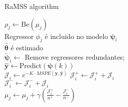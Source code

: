 \documentclass[12pt,a4paper,titlepage,final]{book}
\theoremstyle{definition}
\begin{document}
%

\begin{algorithm}[htpb]
  \caption{RaMSS algorithm}\label{alg:RaMSS}
  {
     {
        {
           $\rho_j \gets \text{Be}(\mu_j)$ \\
           {
              Regressor $\phi_j$ é incluido no modelo $\bm{\psi}_i$\\
           }
        }
        $\hat{\bm{\theta}}$ é estimado \\
        $\tilde{\bm{\psi}}_i \gets $ Remove regressores redundantes; \\
        $\hat{\bm{y}} \gets \text{Predict}(\bm{\psi}(k))$ \\
        $\mathcal{J}_i \gets e^{-K\cdot MSPE(\bm{y},\bm{\hat{y}})} $
     }
     {
        {
           {
              $\mathcal{J}_i^{+} \gets \mathcal{J}_i^{+} + \mathcal{J}_i$ \\
           } \Else
           {
              $\mathcal{J}_i^{-} \gets \mathcal{J}_i^{-} + \mathcal{J}_i$ \\
           }
        }
        $\mu_j \gets \mu_j + \gamma  \left( \frac{\mathcal{J}_i^{+}}{n^+} - \frac{\mathcal{J}_i^{-}}{n^-} \right) $ \\
     }
  }
\end{algorithm}%

\newpage
\end{document}
